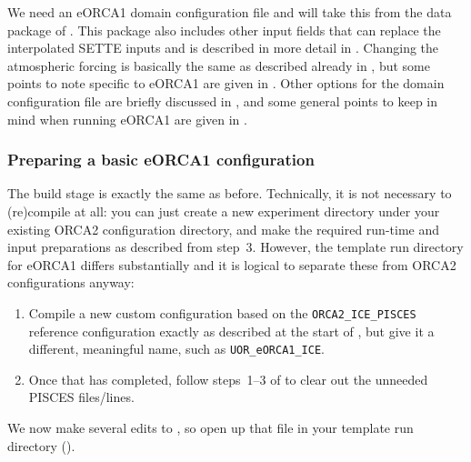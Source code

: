 We need an eORCA1 domain configuration file and will take this from the data package of \citet{delavergne2024eorca1}.
This package also includes other input fields that can replace the interpolated SETTE inputs and is described in more detail in .
Changing the atmospheric forcing is basically the same as described already in , but some points to note specific to eORCA1 are given in .
Other options for the domain configuration file are briefly discussed in , and some general points to keep in mind when running eORCA1 are given in .


\clearpage
\subsubsection{Preparing a basic eORCA1 configuration}
\label{sec:grids-eorca1-basic}

The build stage is exactly the same as before.
Technically, it is not necessary to (re)compile at all: you can just create a new experiment directory under your existing ORCA2 configuration directory, and make the required run-time and input preparations as described from step~3.
However, the template run directory for eORCA1 differs substantially and it is logical to separate these from ORCA2 configurations anyway:
\begin{enumerate}
    \item Compile a new custom configuration based on the \mbox{\texttt{ORCA2_ICE_PISCES}} reference configuration exactly as described at the start of , but give it a different, meaningful name, such as \mbox{\texttt{UOR_eORCA1_ICE}}.
    \item Once that has completed, follow steps~\mbox{1--3} of  to clear out the unneeded PISCES files/lines.
\end{enumerate}

We now make several edits to , so open up that file in your template run directory ().

